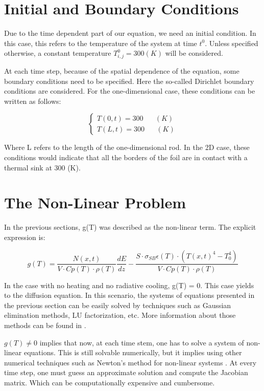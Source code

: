 \section{Initial and Boundary Conditions}

Due to the time dependent part of our equation, we need an initial condition. In this case, this refers to the temperature of the system at time $t^0$. Unless specified otherwise, a constant temperature $T_{i,j}^0 = 300 (K)$ will be considered.

At each time step, because of the spatial dependence of the equation, some boundary conditions need to be specified. Here the so-called Dirichlet boundary conditions are considered. For the one-dimensional case, these conditions can be written as follows: 

\begin{equation}
    \begin{cases}
      T(0,t) = 300 \mspace{30mu} (K) \\
      T(L,t) = 300 \mspace{30mu} (K) 
    \end{cases}
\end{equation}

Where L refers to the length of the one-dimensional rod. In the 2D case, these conditions would indicate that all the borders of the foil are in contact with a thermal sink at 300 (K). 

\section{The Non-Linear Problem}

In the previous sections, g(T) was described as the non-linear term. The explicit expression is: 

\begin{equation}
    g(T) = \frac{N(x,t)}{V\cdot Cp(T)\cdot \rho(T)}\frac{dE}{dz} - \frac{S\cdot \sigma_{SB}\epsilon(T)\cdot \left( T(x,t)^4 - T_0^4\right)}{V\cdot Cp(T)\cdot \rho(T)}
\end{equation}

In the case with no heating and no radiative cooling, g(T) = 0. This case yields to the diffusion equation. In this scenario, the systems of equations presented in the previous section can be easily solved by techniques such as Gaussian elimination methods, LU factorization, etc. More information about those methods can be found in \parencite[][]{ref:AlvaroBook}. 

$g(T) \neq 0$ implies that now, at each time stem, one has to solve a system of non-linear equations. This is still solvable numerically, but it implies using other numerical techniques such as Newton's method for non-linear systems \parencite[][]{ref:AlvaroBook}. At every time step, one must guess an approximate solution and compute the Jacobian matrix. Which can be computationally expensive and cumbersome. 

